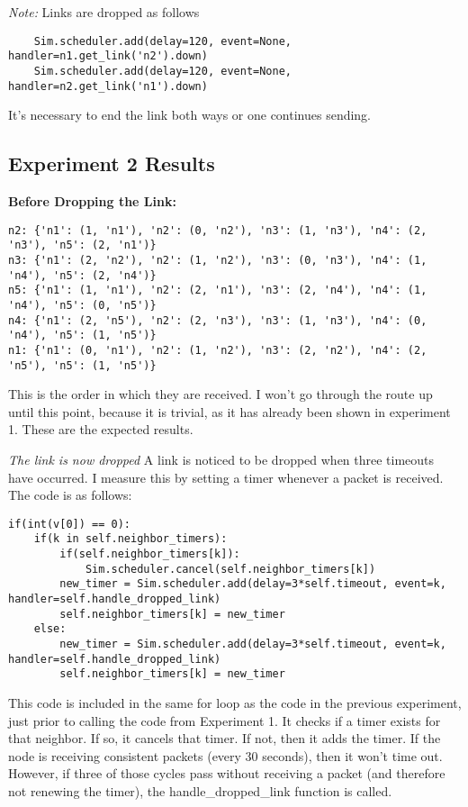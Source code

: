 \documentclass[fleqn,11pt]{article}
\begin{document}
\emph{Note:} Links are dropped as follows
\begin{lstlisting}
    Sim.scheduler.add(delay=120, event=None, handler=n1.get_link('n2').down)
    Sim.scheduler.add(delay=120, event=None, handler=n2.get_link('n1').down)
\end{lstlisting}

It's necessary to end the link both ways or one continues sending.

\subsection{Experiment 2 Results}

\textbf{Before Dropping the Link:}
\begin{lstlisting}
n2: {'n1': (1, 'n1'), 'n2': (0, 'n2'), 'n3': (1, 'n3'), 'n4': (2, 'n3'), 'n5': (2, 'n1')}
n3: {'n1': (2, 'n2'), 'n2': (1, 'n2'), 'n3': (0, 'n3'), 'n4': (1, 'n4'), 'n5': (2, 'n4')}
n5: {'n1': (1, 'n1'), 'n2': (2, 'n1'), 'n3': (2, 'n4'), 'n4': (1, 'n4'), 'n5': (0, 'n5')}
n4: {'n1': (2, 'n5'), 'n2': (2, 'n3'), 'n3': (1, 'n3'), 'n4': (0, 'n4'), 'n5': (1, 'n5')}
n1: {'n1': (0, 'n1'), 'n2': (1, 'n2'), 'n3': (2, 'n2'), 'n4': (2, 'n5'), 'n5': (1, 'n5')}
\end{lstlisting}
This is the order in which they are received. I won't go through the route up until this point, because it is trivial, as it has already been shown in experiment 1. These are the expected results.

\emph{The link is now dropped}
A link is noticed to be dropped when three timeouts have occurred. I measure this by setting a timer whenever a packet is received. The code is as follows:
\begin{lstlisting}
if(int(v[0]) == 0):
    if(k in self.neighbor_timers):
        if(self.neighbor_timers[k]):
            Sim.scheduler.cancel(self.neighbor_timers[k])
        new_timer = Sim.scheduler.add(delay=3*self.timeout, event=k, handler=self.handle_dropped_link)
        self.neighbor_timers[k] = new_timer
    else:
        new_timer = Sim.scheduler.add(delay=3*self.timeout, event=k, handler=self.handle_dropped_link)
        self.neighbor_timers[k] = new_timer
\end{lstlisting}

This code is included in the same for loop as the code in the previous experiment, just prior to calling the code from Experiment 1. It checks if a timer exists for that neighbor. If so, it cancels that timer. If not, then it adds the timer. If the node is receiving consistent packets (every 30 seconds), then it won't time out. However, if three of those cycles pass without receiving a packet (and therefore not renewing the timer), the handle_dropped_link function is called.
\end{document}
